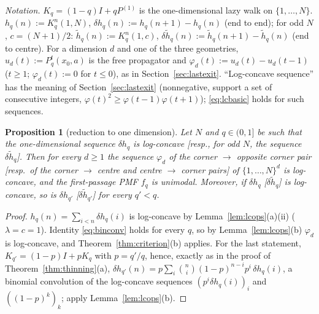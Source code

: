 \documentclass[11pt,a4paper]{article}
\newtheorem{proposition}[theorem]{Proposition}
\theoremstyle{definition}
\begin{document}
\emph{Notation.} $K_q=(1-q)I+qP^{(1)}$ is the one-dimensional lazy walk on $\{1,\dots,N\}$. $h_q(n):=K_q^n(1,N)$, $\delta h_q(n):=h_q(n+1)-h_q(n)$ (end to end); for odd $N$, $c=(N+1)/2$: $\tilde h_q(n):=K_q^n(1,c)$, $\delta\tilde h_q(n):=\tilde h_q(n+1)-\tilde h_q(n)$ (end to centre). For a dimension $d$ and one of the three geometries, $u_d(t):=P_q^t(x_0,a)$ is the free propagator and $\varphi_d(t):=u_d(t)-u_d(t-1)$ ($t\ge1$; $\varphi_d(t):=0$ for $t\le0$), as in Section~\ref{sec:lastexit}. ``Log-concave sequence'' has the meaning of Section~\ref{sec:lastexit} (nonnegative, support a set of consecutive integers, $\varphi(t)^2\ge\varphi(t-1)\varphi(t+1)$); \eqref{eq:lcbasic} holds for such sequences.

\begin{proposition}[reduction to one dimension]\label{prop:reduction}
Let $N$ and $q\in(0,1]$ be such that the one-dimensional sequence $\delta h_q$ is log-concave [resp., for odd $N$, the sequence $\delta\tilde h_q$]. Then for every $d\ge1$ the sequence $\varphi_d$ of the corner $\to$ opposite corner pair [resp.\ of the corner $\to$ centre and centre $\to$ corner pairs] of $\{1,\dots,N\}^d$ is log-concave, and the first-passage PMF $f_q$ is unimodal. Moreover, if $\delta h_q$ [$\delta\tilde h_q$] is log-concave, so is $\delta h_{q'}$ [$\delta\tilde h_{q'}$] for every $q'<q$.
\end{proposition}
\begin{proof}
$h_q(n)=\sum_{i<n}\delta h_q(i)$ is log-concave by Lemma~\ref{lem:lcops}(a)(ii) ($\lambda=c=1$). Identity \eqref{eq:binconv} holds for every $q$, so by Lemma~\ref{lem:lcops}(b) $\varphi_d$ is log-concave, and Theorem~\ref{thm:criterion}(b) applies. For the last statement, $K_{q'}=(1-p)I+pK_q$ with $p=q'/q$, hence, exactly as in the proof of Theorem~\ref{thm:thinning}(a), $\delta h_{q'}(n)=p\sum_i\binom ni(1-p)^{n-i}p^i\,\delta h_q(i)$, a binomial convolution of the log-concave sequences $(p^i\delta h_q(i))_i$ and $((1-p)^k)_k$; apply Lemma~\ref{lem:lcops}(b).
\end{proof}
\end{document}
